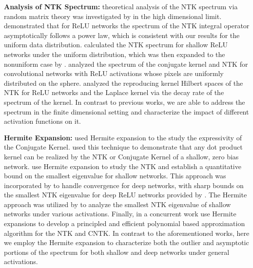 \textbf{Analysis of NTK Spectrum:} theoretical analysis of the NTK spectrum via random matrix theory was investigated by \cite{https://doi.org/10.48550/arxiv.1907.10599,NEURIPS2020_572201a4} in the high dimensional limit. \cite{NEURIPS2021_14faf969} demonstrated that for ReLU networks the spectrum of the NTK integral operator asymptotically follows a power law, which is consistent with our results for the uniform data distribution. \cite{uniform_sphere_data} calculated the NTK spectrum for shallow ReLU networks under the uniform distribution, which was then expanded to the nonuniform case by \cite{10.5555/3524938.3525002}. \cite{geifman2022on} analyzed the spectrum of the conjugate kernel and NTK for convolutional networks with ReLU activations whose pixels are uniformly distributed on the sphere.  \cite{geifman2020similarity, bietti2021deep,chen2021deep} analyzed the reproducing kernel Hilbert spaces of the NTK for ReLU networks and the Laplace kernel via the decay rate of the spectrum of the kernel.  In contrast to previous works, we are able to address the spectrum in the finite dimensional setting and characterize the impact of different activation functions on it. 

\textbf{Hermite Expansion:} \cite{dual_view} used Hermite expansion to the study the expressivity of the Conjugate Kernel. \cite{pmlr-v162-simon22a} used this technique to demonstrate that any dot product kernel can be realized by the NTK or Conjugate Kernel of a shallow, zero bias network. \cite{solt_mod_over} use Hermite expansion to study the NTK and establish a quantitative bound on the smallest eigenvalue for shallow networks. This approach was incorporated by \cite{marco} to handle convergence for deep networks, with sharp bounds on the smallest NTK eigenvalue for deep ReLU networks provided by \cite{nguyen_tight_bounds}. The Hermite approach was utilized by \cite{Panigrahi2020Effect} to analyze the smallest NTK eigenvalue of shallow networks under various activations. Finally, in a concurrent work \cite{han2022fast} use Hermite expansions to develop a principled and efficient polynomial based approximation algorithm for the NTK and CNTK. In contrast to the aforementioned works, here we employ the Hermite expansion to characterize both the outlier and asymptotic portions of the spectrum for both shallow and deep networks under general activations. 

